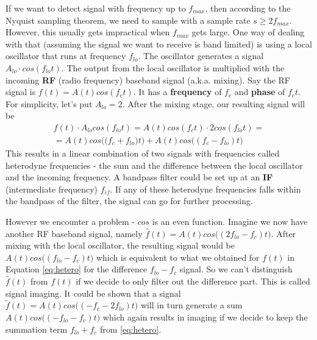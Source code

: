 \documentclass[a4paper,12pt,twoside,openright]{report}
\begin{document}
If we want to detect signal with frequency up to $f_{max}$, then according to the Nyquist sampling theorem, we need to sample with a sample rate $s \geq 2 f_{max}$. However, this usually gets impractical when $f_{max}$ gets large. One way of dealing with that (assuming the signal we want to receive is band limited) is using a local oscillator that runs at frequency $f_{lo}$. The oscillator generates a signal $A_{lo} \cdot cos(f_{lo} t)$. The output from the local oscillator is multiplied with the incoming \textbf{RF} (radio frequency) baseband signal (a.k.a. mixing). Say the RF signal is $f(t) = A(t) cos(f_{c} t)$. It has a \textbf{frequency} of $f_{c}$ and \textbf{phase} of $f_{c} t$. For simplicity, let's put $A_{lo} = 2$. After the mixing stage, our resulting signal will be
\begin{multline}
\label{eq:hetero}
f(t) \cdot A_{lo} cos(f_{lo} t) =  A(t) cos(f_{c} t) \cdot 2 cos(f_{lo} t) = \\
=  A(t) cos\big( (f_{c} + f_{lo} \big) t\big) + A(t) cos\big( (f_{c} - f_{lo}) t \big)
\end{multline}
This results in a linear combination of two signals with frequencies called heterodyne frequencies - the sum and the difference between the local oscillator and the incoming frequency. A bandpass filter could be set up at an \textbf{IF} (intermediate frequency) $f_{if}$. If any of these heterodyne frequencies falls within the bandpass of the filter, the signal can go for further processing.

However we encounter a problem - $cos$ is an even function. Imagine we now have another RF baseband signal, namely $\hat{f}(t) = A(t) cos\big( (2 f_{lo} - f_{c}) t\big)$. After mixing with the local oscillator, the resulting signal would be $A(t) cos\big( (f_{lo} - f_{c}) t \big)$ which is equivalent to what we obtained for $f(t)$ in Equation \ref{eq:hetero} for the difference $f_{lo} - f_{c}$ signal. So we can't distinguish $\hat{f}(t)$ from $f(t)$ if we decide to only filter out the difference part. This is called signal imaging. It could be shown that a signal $\tilde{f}(t) = A(t) cos\big( (- f_{c} - 2 f_{lo}) t\big)$ will in turn generate a sum $A(t) cos\big( ( - f_{lo} - f_{c}) t \big)$ which again results in imaging if we decide to keep the summation term $f_{lo} + f_{c}$ from \ref{eq:hetero}.
\end{document}
